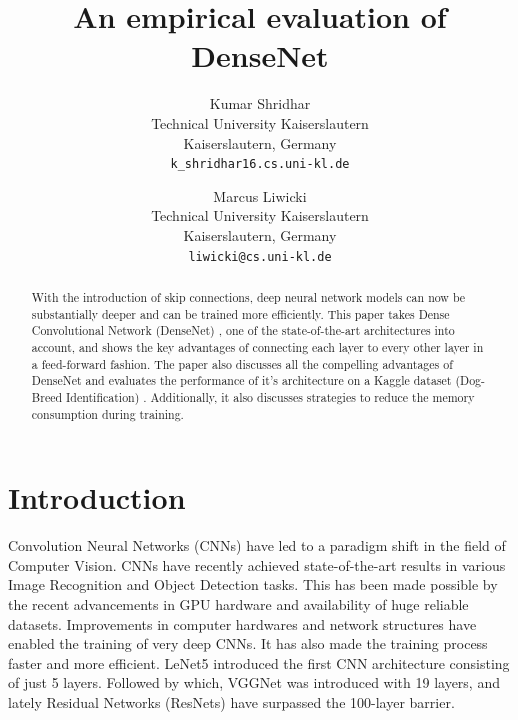 \documentclass[11pt,twocolumn,letterpaper]{article}
\begin{document}
\title{An empirical evaluation of DenseNet}

\author{Kumar Shridhar\\
Technical University Kaiserslautern\\
Kaiserslautern, Germany\\
{\tt\small k\_shridhar16.cs.uni-kl.de}
\and
Marcus Liwicki \\
Technical University Kaiserslautern\\
Kaiserslautern, Germany\\
{\tt\small liwicki@cs.uni-kl.de}
}

\maketitle

\begin{abstract}
   With the introduction of skip connections, deep neural network models can now be substantially deeper and can be trained more efficiently. This paper takes Dense Convolutional Network (DenseNet) \cite{DBLP:journals/corr/HuangLW16a}, one of the state-of-the-art architectures into account, and shows the key advantages of connecting each layer to every other layer in a feed-forward fashion. The paper also discusses all the compelling advantages of DenseNet and evaluates the performance of it's architecture on a Kaggle dataset (Dog-Breed Identification) \cite{KhoslaYaoJayadevaprakashFeiFei_FGVC2011}. Additionally, it also discusses strategies to reduce the memory consumption during training.      
\end{abstract}

\section{Introduction}

Convolution Neural Networks (CNNs) \cite{LeCun:1989:BAH:1351079.1351090} have led to a paradigm shift in the field of Computer Vision. CNNs have recently achieved state-of-the-art results in various Image Recognition and Object Detection tasks. This has been made possible by the recent advancements in GPU hardware and availability of huge reliable datasets. Improvements in computer hardwares and network structures have enabled the training of very deep CNNs. It has also made the training process faster and more efficient. LeNet5 \cite{Lecun98gradient-basedlearning} introduced the first CNN architecture consisting of just 5 layers. Followed by which, VGGNet was introduced with 19 layers, and lately Residual Networks (ResNets) \cite{DBLP:journals/corr/HeZRS15} have surpassed the 100-layer barrier. 
\end{document}
